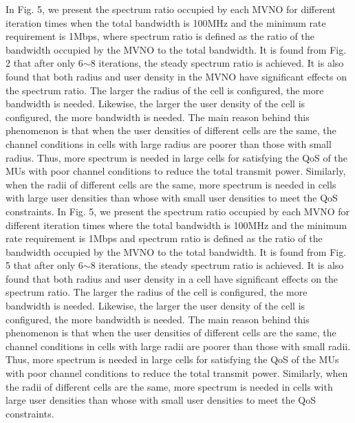 \documentclass[journal]{IEEEtran}
\begin{document}
\begin{IEEEkeywords}
In Fig. 5, we present the spectrum ratio occupied by each MVNO for different iteration times when the total bandwidth is 100MHz and the minimum rate requirement is 1Mbps, where spectrum ratio is defined as the ratio of the bandwidth occupied by the MVNO to the total bandwidth.  It is found from Fig. 2 that after only 6$\sim$8 iterations, the steady spectrum ratio is achieved. It is also found that both radius and user density in the MVNO have significant effects on the spectrum ratio. The larger the radius of the cell is configured, the more bandwidth is needed. Likewise, the larger the user density of the cell is configured, the more bandwidth is needed. The main reason behind this phenomenon is that when the user densities of different cells are the same, the channel conditions in cells with large radius are poorer than those with small radius. Thus, more spectrum is needed in large cells for satisfying the QoS of the MUs with poor channel conditions to reduce the total transmit power. Similarly, when the radii of different cells are the same, more spectrum is needed in cells with large user densities than whose with small user densities to meet the QoS constraints.
In Fig. 5, we present the spectrum ratio occupied by each MVNO for different iteration times where the total bandwidth is 100MHz and the minimum rate requirement is 1Mbps and spectrum ratio is defined as the ratio of the bandwidth occupied by the MVNO to the total bandwidth.  It is found from Fig. 5 that after only 6$\sim$8 iterations, the steady spectrum ratio is achieved. It is also found that both radius and user density in a cell have significant effects on the spectrum ratio. The larger the radius of the cell is configured, the more bandwidth is needed. Likewise, the larger the user density of the cell is configured, the more bandwidth is needed. The main reason behind this phenomenon is that when the user densities of different cells are the same, the channel conditions in cells with large radii are poorer than those with small radii. Thus, more spectrum is needed in large cells for satisfying the QoS of the MUs with poor channel conditions to reduce the total transmit power. Similarly, when the radii of different cells are the same, more spectrum is needed in cells with large user densities than whose with small user densities to meet the QoS constraints.


\end{IEEEkeywords}
\end{document}
